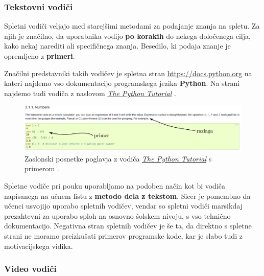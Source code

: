 \subsubsection{Tekstovni vodiči}

Spletni vodiči veljajo med starejšimi metodami za podajanje znanja na
spletu. Za njih je značilno, da uporabnika vodijo \textbf{po korakih}
do nekega določenega cilja, kako nekaj narediti ali specifičnega
znanja. Besedilo, ki podaja znanje je opremljeno z
\textbf{primeri}. \cite{wiki:tutorials}

Značilni predstavniki takih vodičev je spletna stran
\url{https://docs.python.org} na kateri najdemo vso dokumentacijo
programskega jezika \textbf{Python}. Na strani najdemo tudi vodiča z
naslovom \emph{\href{https://docs.python.org/3/tutorial/index.html}{The
  Python Tutorial}} \cite{web:TPythonTut}.

\begin{figure}[h!]
  \includegraphics [width=1\linewidth, keepaspectratio =
  1] {./images/sc_web/tPyTut_01.jpg}
      \caption{Zaslonski posnetke poglavja z vodiča
      \emph{\href{https://docs.python.org/3/tutorial/index.html}{The
          Python Tutorial}} s primerom \cite{web:TPythonTut}.}
    \label{fig:scr:web:tPyTut}
\end{figure}

Spletne vodiče pri pouku uporabljamo na podoben način kot bi vodiča
napisanega na učnem listu z \textbf{metodo dela z tekstom}. Sicer je
pomembno da učenci usvojijo uporabo spletnih vodičev, vendar so
spletni vodiči marsikdaj prezahtevni za uporabo sploh na osnovno
šolskem nivoju, s vso tehnično dokumentacijo. Negativna stran spletnih
vodičev je še ta, da direktno s spletne strani ne moramo preizkušati
primerov programske kode, kar je slabo tudi z motivacijskega vidika.

\subsubsection{Video vodiči}
\label{sec:video_vodici}

